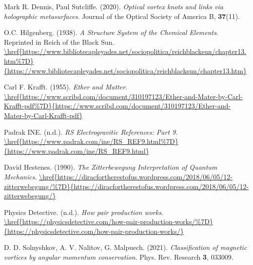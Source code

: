 \begin{thebibliography}{99}



Mark R. Dennis, Paul Sutcliffe. (2020). \textit{Optical vortex knots and links via holographic metasurfaces}. Journal of the Optical Society of America B, \textbf{37}(11). \href{\href{https://doi.org/10.1080/23746149.2020.1843535%7D%7Bhttps://doi.org/10.1080/23746149.2020.1843535%7D}{https://doi.org/10.1080/23746149.2020.1843535}{https://doi.org/10.1080/23746149.2020.1843535}}



O.C. Hilgenberg. (1938). \textit{A Structure System of the Chemical Elements}. Reprinted in Reich of the Black Sun. \url{\href{https://www.bibliotecapleyades.net/sociopolitica/reichblacksun/chapter13.htm%7D}{https://www.bibliotecapleyades.net/sociopolitica/reichblacksun/chapter13.htm}}



Carl F. Krafft. (1955). \textit{Ether and Matter}. \url{\href{https://www.scribd.com/document/310197123/Ether-and-Mater-by-Carl-Krafft-pdf%7D}{https://www.scribd.com/document/310197123/Ether-and-Mater-by-Carl-Krafft-pdf}}



Padrak INE. (n.d.). \textit{RS Electrogravitic References: Part 9}. \url{\href{https://www.padrak.com/ine/RS_REF9.html%7D}{https://www.padrak.com/ine/RS_REF9.html}}



David Hestenes. (1990). \textit{The Zitterbewegung Interpretation of Quantum Mechanics}. \url{\href{https://diracfortherestofus.wordpress.com/2018/06/05/12-zitterwebegung/%7D}{https://diracfortherestofus.wordpress.com/2018/06/05/12-zitterwebegung/}}



Physics Detective. (n.d.). \textit{How pair production works}. \url{\href{https://physicsdetective.com/how-pair-production-works/%7D}{https://physicsdetective.com/how-pair-production-works/}}



D. D. Solnyshkov, A. V. Nalitov, G. Malpuech. (2021). \textit{Classification of magnetic vortices by angular momentum conservation}. Phys. Rev. Research \textbf{3}, 033009. 




\end{thebibliography}
